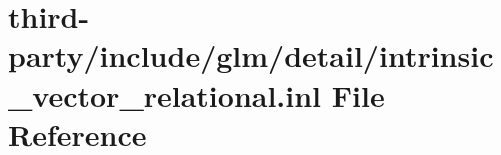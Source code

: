 \hypertarget{intrinsic__vector__relational_8inl}{}\section{third-\/party/include/glm/detail/intrinsic\+\_\+vector\+\_\+relational.inl File Reference}
\label{intrinsic__vector__relational_8inl}
